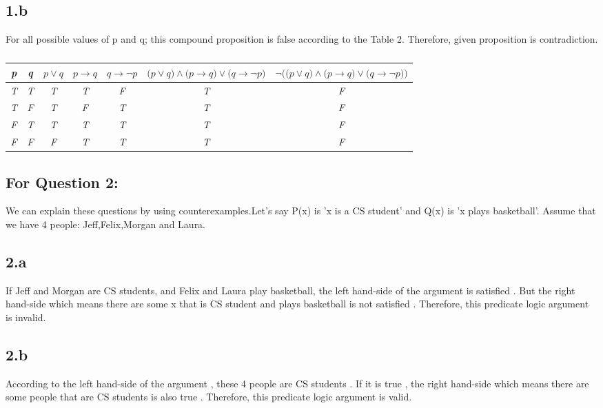 \documentclass[12pt]{article}
\begin{document}
\subsection*{1.b}
\hspace{20px}For all possible values of p and q; this compound proposition is false according to the Table 2. Therefore, given proposition is contradiction.
\begin{table}[H]
	\centering
	\caption{} 
	\bigskip
	\begin{tabular}{|c|c|c|c|c|c|c|} \hline
	\textit{p} & \textit{q} & $\textit{p}  \vee{q} $ & $\textit{p} \rightarrow{q} $& $\textit{q} \rightarrow{\neg{p}}$ &$\textit{(p} \vee{q)} \wedge{(p} \rightarrow{q)} \vee{(q} \rightarrow \neg{p)} $ &$\neg{((p} \vee{q)} \wedge{(p} \rightarrow{q)} \vee{(q} \rightarrow \neg{p))} $ \\ \hline
	\textit{T} & \textit{T} & \textit{T} & \textit{T}& \textit{F}&\textit{T}& \textit{F} \\ \hline
	\textit{T} & \textit{F} &\textit{T} &\textit{F} &\textit{T} &\textit{T}& \textit{F} \\ \hline
	\textit{F} & \textit{T} & \textit{T}&\textit{T} &\textit{T} &\textit{T}& \textit{F} \\ \hline
	\textit{F} & \textit{F} & \textit{F}&\textit{T} & \textit{T}&\textit{T}& \textit{F} \\ \hline
	
	
	\end{tabular}
	\end{table}
\subsection*{For Question 2:}\hspace{20px}We can explain these questions by using counterexamples.Let's say P(x) is 'x is a CS student' and Q(x) is 'x plays basketball'. Assume that we have 4 people: Jeff,Felix,Morgan and Laura. 
\subsection*{2.a}\hspace{20px}If Jeff and Morgan are CS students, and Felix and Laura play basketball, the left hand-side of the argument is satisfied . But the right hand-side which means there are some x that is CS student and plays basketball is not satisfied . Therefore, this predicate logic argument is invalid.
\subsection*{2.b}\hspace{20px}According to the left hand-side of the argument , these 4 people are CS students . If it is true , the right hand-side which means there are some people that are CS students is also true . Therefore, this predicate logic argument is valid. 
\end{document}
